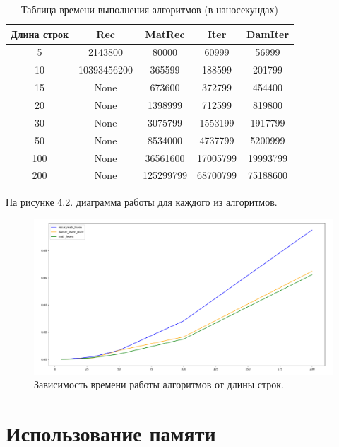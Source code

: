 \documentclass[12pt]{report}
\begin{document}
\begin{table} [h!]
	\caption{Таблица времени выполнения алгоритмов (в наносекундах)}
	\begin{center}
		\begin{tabular}{|c c c c c|} 
		 	\hline
			Длина строк & Rec & MatRec & Iter & DamIter \\  
		 	\hline
		 	5 & 2143800 & 80000 & 60999 & 56999\\
		 	\hline
		 	10 & 10393456200 & 365599 & 188599 & 201799\\
		 	\hline
		 	15 & None  & 673600 & 372799 & 454400\\
		 	\hline
		 	20 & None  & 1398999 & 712599 & 819800 \\
		 	\hline
			30 & None  & 3075799 & 1553199 & 1917799 \\
			\hline
			50 & None  & 8534000 & 4737799 & 5200999 \\
			\hline
			100 & None  & 36561600 & 17005799 & 19993799\\
			\hline
			200 & None  & 125299799 & 68700799 & 75188600 \\
			\hline
		\end{tabular}
	\end{center}
\end{table}
\clearpage
На рисунке 4.2. диаграмма работы для каждого из алгоритмов.
\begin{figure}[h]
	\begin{center}
	\includegraphics[scale=0.6]{time.png}
	 \caption{Зависимость времени работы алгоритмов от длины строк.}
	\end{center}
\end{figure}

\section{Использование памяти}
\end{document}
